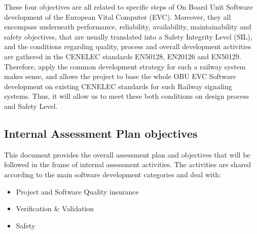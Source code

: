 \documentclass{template/openetcs_article}
\begin{document}
These four objectives are all related to specific steps of On Board Unit Software development of the European Vital Computer (EVC). Moreover, they all encompass underneath performance, reliability, availability, maintainability and safety objectives, that are usually translated into a Safety Integrity Level (SIL), and the conditions regarding quality, process and overall development activities are gathered in the CENELEC standards EN50128, EN20126 and EN50129.
Therefore, apply the common development strategy for such a railway system makes sense, and allows the project to base the whole OBU EVC Software development on existing CENELEC standards for such Railway signaling systems. Thus, it will allow us to meet these both conditions on design process and Safety Level.

\subsection{Internal Assessment Plan objectives}
This document provides the overall assessment plan and objectives that will be followed in the frame of internal assessment activities.
The activities are shared according to the main software development categories and deal with:
\begin{itemize}
\item Project and Software Quality insurance
\item Verification \& Validation
\item Safety
\end{itemize}
\end{document}
